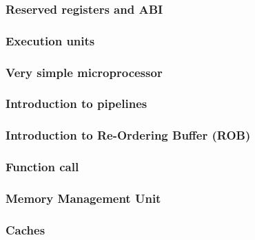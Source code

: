 \begin{frame}
  \frametitle{Reserved registers and ABI}

\end{frame}


\begin{frame}
  \frametitle{Execution units}

\end{frame}


\begin{frame}
  \frametitle{Very simple microprocessor}

\end{frame}


\begin{frame}
  \frametitle{Introduction to pipelines}

  \begin{center}
  \end{center}

\end{frame}


\begin{frame}
  \frametitle{Introduction to Re-Ordering Buffer (ROB)}

  \begin{center}
  \end{center}

\end{frame}


\begin{frame}
  \frametitle{Function call}

\end{frame}


\begin{frame}
  \frametitle{Memory Management Unit}

\end{frame}


\begin{frame}
  \frametitle{Caches}

  \begin{center}
  \end{center}

\end{frame}

